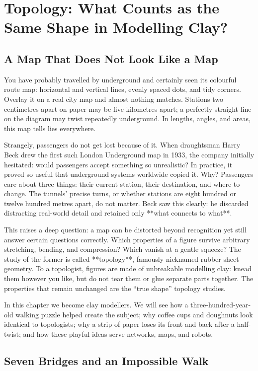 \chapter{Topology: What Counts as the Same Shape in Modelling Clay?}

\section{A Map That Does Not Look Like a Map}

You have probably travelled by underground and certainly seen its colourful route map: horizontal and vertical lines, evenly spaced dots, and tidy corners. Overlay it on a real city map and almost nothing matches. Stations two centimetres apart on paper may be five kilometres apart; a perfectly straight line on the diagram may twist repeatedly underground. In lengths, angles, and areas, this map tells lies everywhere.

Strangely, passengers do not get lost because of it. When draughtsman Harry Beck drew the first such London Underground map in 1933, the company initially hesitated: would passengers accept something so unrealistic? In practice, it proved so useful that underground systems worldwide copied it. Why? Passengers care about three things: their current station, their destination, and where to change. The tunnels' precise turns, or whether stations are eight hundred or twelve hundred metres apart, do not matter. Beck saw this clearly: he discarded distracting real-world detail and retained only **what connects to what**.

This raises a deep question: a map can be distorted beyond recognition yet still answer certain questions correctly. Which properties of a figure survive arbitrary stretching, bending, and compression? Which vanish at a gentle squeeze? The study of the former is called **topology**, famously nicknamed rubber-sheet geometry. To a topologist, figures are made of unbreakable modelling clay: knead them however you like, but do not tear them or glue separate parts together. The properties that remain unchanged are the ``true shape'' topology studies.

In this chapter we become clay modellers. We will see how a three-hundred-year-old walking puzzle helped create the subject; why coffee cups and doughnuts look identical to topologists; why a strip of paper loses its front and back after a half-twist; and how these playful ideas serve networks, maps, and robots.

\section{Seven Bridges and an Impossible Walk}

